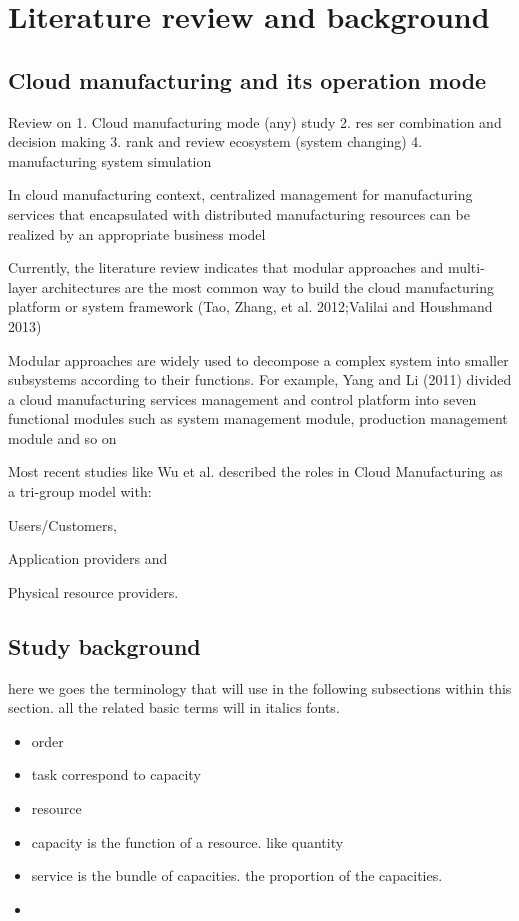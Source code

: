 \section{Literature review and background} %
\label{sec:literature_review}
\subsection{Cloud manufacturing and its operation mode} %
\label{sub:cloud_manufacturing review}

Review on 1. Cloud manufacturing mode (any) study 
2. res ser combination and decision making
3. rank and review ecosystem (system changing)
4. manufacturing system simulation

In cloud manufacturing context, centralized management for manufacturing services that encapsulated with distributed manufacturing resources can be realized by an appropriate business model\cite{Xu2012}

Currently, the literature review indicates that modular approaches and multi-layer architectures are the most common way to build the cloud manufacturing platform or system framework (Tao, Zhang, et al. 2012;Valilai and Houshmand 2013)

Modular approaches are widely used to decompose a complex system into smaller subsystems according to their functions. For example, Yang and Li (2011) divided a cloud manufacturing services management and control platform into seven functional modules such as system management module, production management module and so on


Most recent studies like Wu et al.\cite{Wu2013} described the roles in Cloud Manufacturing as a tri-group model with:\begin{inparaenum}[1)]
\item Users/Customers,
\item Application providers and
\item Physical resource providers.
\end{inparaenum}


\subsection{Study background} %
\label{sub:background}

here we goes the terminology that will use in the following subsections within this section. all the related basic terms will in italics fonts.
\begin{itemize}
	\item order
	\item task correspond to capacity
	\item resource
	\item capacity is the function of a resource. like quantity
	\item service is the bundle of capacities. the proportion of the capacities.
	\item 
\end{itemize}

